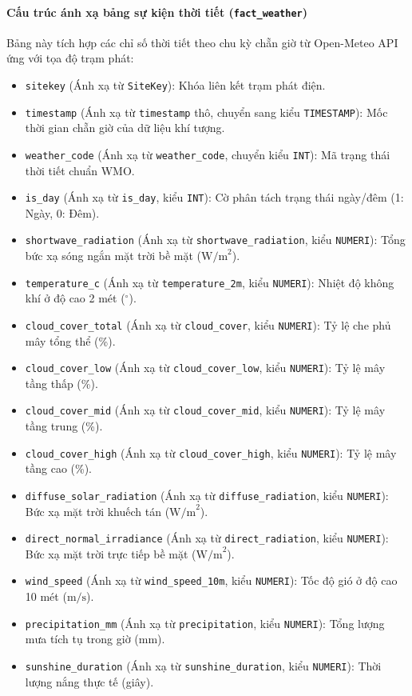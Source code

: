 \documentclass[12pt,a4paper]{article}
\begin{document}
\paragraph{Cấu trúc ánh xạ bảng sự kiện thời tiết (\texttt{fact\_weather})}
Bảng này tích hợp các chỉ số thời tiết theo chu kỳ chẵn giờ từ Open-Meteo API ứng với tọa độ trạm phát:
\begin{itemize}
    \item \texttt{sitekey} (Ánh xạ từ \texttt{SiteKey}): Khóa liên kết trạm phát điện.
    \item \texttt{timestamp} (Ánh xạ từ \texttt{timestamp} thô, chuyển sang kiểu \texttt{TIMESTAMP}): Mốc thời gian chẵn giờ của dữ liệu khí tượng.
    \item \texttt{weather\_code} (Ánh xạ từ \texttt{weather\_code}, chuyển kiểu \texttt{INT}): Mã trạng thái thời tiết chuẩn WMO.
    \item \texttt{is\_day} (Ánh xạ từ \texttt{is\_day}, kiểu \texttt{INT}): Cờ phân tách trạng thái ngày/đêm (1: Ngày, 0: Đêm).
    \item \texttt{shortwave\_radiation} (Ánh xạ từ \texttt{shortwave\_radiation}, kiểu \texttt{NUMERI}): Tổng bức xạ sóng ngắn mặt trời bề mặt ($\text{W/m}^2$).
    \item \texttt{temperature\_c} (Ánh xạ từ \texttt{temperature\_2m}, kiểu \texttt{NUMERI}): Nhiệt độ không khí ở độ cao 2 mét ($^\circ\text{}$).
    \item \texttt{cloud\_cover\_total} (Ánh xạ từ \texttt{cloud\_cover}, kiểu \texttt{NUMERI}): Tỷ lệ che phủ mây tổng thể (\%).
    \item \texttt{cloud\_cover\_low} (Ánh xạ từ \texttt{cloud\_cover\_low}, kiểu \texttt{NUMERI}): Tỷ lệ mây tầng thấp (\%).
    \item \texttt{cloud\_cover\_mid} (Ánh xạ từ \texttt{cloud\_cover\_mid}, kiểu \texttt{NUMERI}): Tỷ lệ mây tầng trung (\%).
    \item \texttt{cloud\_cover\_high} (Ánh xạ từ \texttt{cloud\_cover\_high}, kiểu \texttt{NUMERI}): Tỷ lệ mây tầng cao (\%).
    \item \texttt{diffuse\_solar\_radiation} (Ánh xạ từ \texttt{diffuse\_radiation}, kiểu \texttt{NUMERI}): Bức xạ mặt trời khuếch tán ($\text{W/m}^2$).
    \item \texttt{direct\_normal\_irradiance} (Ánh xạ từ \texttt{direct\_radiation}, kiểu \texttt{NUMERI}): Bức xạ mặt trời trực tiếp bề mặt ($\text{W/m}^2$).
    \item \texttt{wind\_speed} (Ánh xạ từ \texttt{wind\_speed\_10m}, kiểu \texttt{NUMERI}): Tốc độ gió ở độ cao 10 mét ($\text{m/s}$).
    \item \texttt{precipitation\_mm} (Ánh xạ từ \texttt{precipitation}, kiểu \texttt{NUMERI}): Tổng lượng mưa tích tụ trong giờ (mm).
    \item \texttt{sunshine\_duration} (Ánh xạ từ \texttt{sunshine\_duration}, kiểu \texttt{NUMERI}): Thời lượng nắng thực tế (giây).
\end{itemize}
\end{document}
